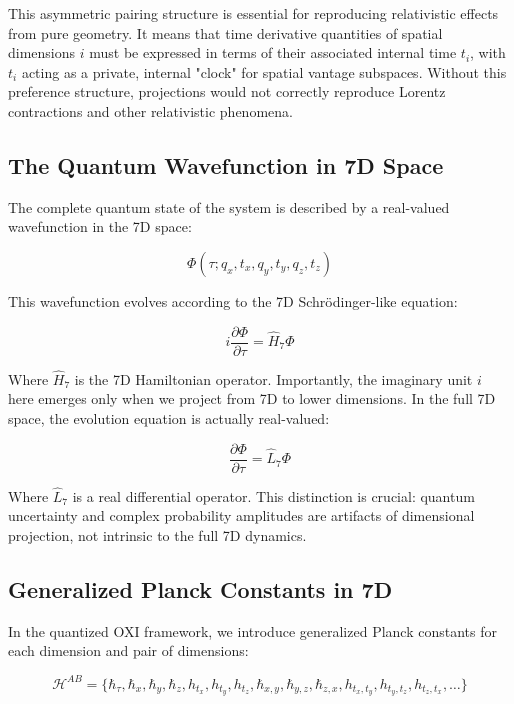 \documentclass{article}
\begin{document}
This asymmetric pairing structure is essential for reproducing relativistic effects from pure geometry. It means that time derivative quantities of spatial dimensions $i$ must be expressed in terms of their associated internal time $t_i$, with $t_i$ acting as a private, internal "clock" for spatial vantage subspaces. Without this preference structure, projections would not correctly reproduce Lorentz contractions and other relativistic phenomena.

\subsection{The Quantum Wavefunction in 7D Space}

The complete quantum state of the system is described by a real-valued wavefunction in the 7D space:

\begin{equation}
\Phi(\tau; q_x, t_x, q_y, t_y, q_z, t_z)
\end{equation}

This wavefunction evolves according to the 7D Schrödinger-like equation:

\begin{equation}
i\frac{\partial \Phi}{\partial \tau} = \hat{H}_7 \Phi
\end{equation}

Where $\hat{H}_7$ is the 7D Hamiltonian operator. Importantly, the imaginary unit $i$ here emerges only when we project from 7D to lower dimensions. In the full 7D space, the evolution equation is actually real-valued:

\begin{equation}
\frac{\partial \Phi}{\partial \tau} = \hat{L}_7 \Phi
\end{equation}

Where $\hat{L}_7$ is a real differential operator. This distinction is crucial: quantum uncertainty and complex probability amplitudes are artifacts of dimensional projection, not intrinsic to the full 7D dynamics.

\subsection{Generalized Planck Constants in 7D}

In the quantized OXI framework, we introduce generalized Planck constants for each dimension and pair of dimensions:

\begin{equation}
\mathcal{H}^{AB} = \{\hbar_\tau, \hbar_x, \hbar_y, \hbar_z, h_{t_x}, h_{t_y}, h_{t_z}, \hbar_{x,y}, \hbar_{y,z}, \hbar_{z,x}, h_{t_x,t_y}, h_{t_y,t_z}, h_{t_z,t_x}, \ldots\}
\end{equation}
\end{document}
